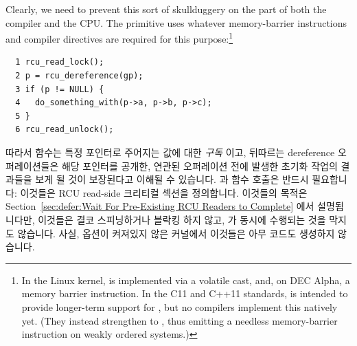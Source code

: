 Clearly, we need to prevent this sort of skullduggery on the
part of both the compiler and the CPU.
The  primitive uses
whatever memory-barrier instructions and compiler
directives are required for this purpose:\footnote{
	In the Linux kernel,  is implemented via
	a volatile cast, and, on DEC Alpha, a memory barrier instruction.
	In the C11 and C++11 standards, 
	is intended to provide longer-term support for ,
	but no compilers implement this natively yet.
	(They instead strengthen  to
	, thus emitting a needless memory-barrier
	instruction on weakly ordered systems.)}
\fi

\vspace{5pt}
\begin{minipage}[t]{\columnwidth}
\scriptsize
\begin{verbatim}
  1 rcu_read_lock();
  2 p = rcu_dereference(gp);
  3 if (p != NULL) {
  4   do_something_with(p->a, p->b, p->c);
  5 }
  6 rcu_read_unlock();
\end{verbatim}
\end{minipage}
\vspace{5pt}

따라서  함수는 특정 포인터로 주어지는 값에 대한
\emph{구독} 이고, 뒤따르는 dereference 오퍼레이션들은 해당 포인터를 공개한,
연관된  오퍼레이션 전에 발생한 초기화 작업의 결과들을
보게 될 것이 보장된다고 이해될 수 있습니다.
 과  함수 호출은 반드시 필요합니다:
이것들은 RCU read-side 크리티컬 섹션을 정의합니다.
이것들의 목적은
Section~\ref{sec:defer:Wait For Pre-Existing RCU Readers to Complete} 에서
설명됩니다만, 이것들은 결코 스피닝하거나 블락킹 하지 않고, 
가 동시에 수행되는 것을 막지도 않습니다.
사실,  옵션이 켜져있지 않은 커널에서 이것들은 아무 코드도
생성하지 않습니다.


